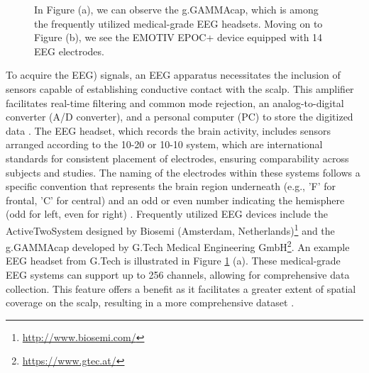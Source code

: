 \begin{figure}%
    \centering
    \qquad
    \caption{In Figure (a), we can observe the g.GAMMAcap, which is among the frequently utilized medical-grade EEG headsets. Moving on to Figure (b), we see the EMOTIV EPOC+ device equipped with 14 EEG electrodes. }
    \label{fig: Headsets}%
\end{figure}
To acquire the EEG) signals, an EEG apparatus necessitates the inclusion of sensors capable of establishing conductive contact with the scalp. This amplifier facilitates real-time filtering and common mode rejection, an analog-to-digital converter (A/D converter), and a personal computer (PC) to store the digitized data \cite{survey_brain_biometrics}. The EEG headset, which records the brain activity, includes sensors arranged according to the 10-20 or 10-10 system, which are international standards for consistent placement of electrodes, ensuring comparability across subjects and studies. The naming of the electrodes within these systems follows a specific convention that represents the brain region underneath (e.g., 'F' for frontal, 'C' for central) and an odd or even number indicating the hemisphere (odd for left, even for right) \cite{abhang2016introduction}. Frequently utilized EEG devices include the ActiveTwoSystem designed by Biosemi (Amsterdam, Netherlands)\footnote{\url{http://www.biosemi.com/}} and the g.GAMMAcap developed by G.Tech Medical Engineering GmbH\footnote{\url{https://www.gtec.at/}}. An example EEG headset from G.Tech is illustrated in Figure \ref{fig: Headsets} (a). These medical-grade EEG systems can support up to 256 channels, allowing for comprehensive data collection. This feature offers a benefit as it facilitates a greater extent of spatial coverage on the scalp, resulting in a more comprehensive dataset \cite{survey_brain_biometrics}.
\smallskip

